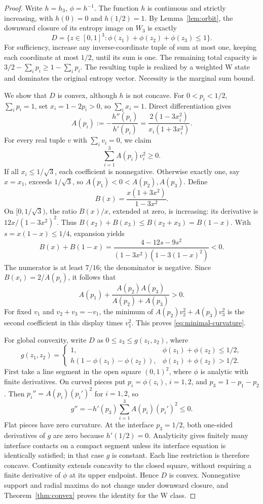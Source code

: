 \documentclass[11pt,a4paper]{article}
\begin{document}
\begin{proof}
Write \(h=h_3\), \(\phi=h^{-1}\). The function \(h\) is continuous
and strictly increasing, with \(h(0)=0\) and \(h(1/2)=1\).
By Lemma~\ref{lem:orbit}, the downward closure of its entropy image
on \(W_3\) is exactly
\[
 D=\{z\in[0,1]^3:\phi(z_1)+\phi(z_2)+\phi(z_3)\le1\}.
\]
For sufficiency, increase any inverse-coordinate tuple of sum at most
one, keeping each coordinate at most \(1/2\), until its sum is one.
The remaining total capacity is \(3/2-\sum_i p_i\ge1-\sum_i p_i\).
The resulting tuple is realized by a weighted W state and dominates
the original entropy vector. Necessity is the marginal sum bound.

We show that \(D\) is convex, although \(h\) is not concave. For
\(0<p_i<1/2\), \(\sum_i p_i=1\), set \(x_i=1-2p_i>0\), so
\(\sum_i x_i=1\). Direct differentiation gives
\[
 A(p_i):=-\frac{h''(p_i)}{h'(p_i)}
 =\frac{2(1-3x_i^2)}{x_i(1+3x_i^2)}.
\]
For every real tuple \(v\) with \(\sum_i v_i=0\), we claim
\begin{equation}
 \sum_{i=1}^3 A(p_i)v_i^2\ge0.\label{eq:minimal-curvature}
\end{equation}
If all \(x_i\le1/\sqrt3\), each coefficient is nonnegative.
Otherwise exactly one, say \(x=x_1\), exceeds \(1/\sqrt3\), so
\(A(p_1)<0<A(p_2),A(p_3)\). Define
\[
 B(x)=\frac{x(1+3x^2)}{1-3x^2}.
\]
On \([0,1/\sqrt3)\), the ratio \(B(x)/x\), extended at zero,
is increasing: its derivative is \(12x/(1-3x^2)^2\).
Thus \(B(x_2)+B(x_3)\le B(x_2+x_3)=B(1-x)\).
With \(s=x(1-x)\le1/4\), expansion yields
\[
 B(x)+B(1-x)
 =\frac{4-12s-9s^2}{(1-3x^2)(1-3(1-x)^2)}<0.
\]
The numerator is at least \(7/16\); the denominator is negative.
Since \(B(x_i)=2/A(p_i)\), it follows that
\[
 A(p_1)+\frac{A(p_2)A(p_3)}{A(p_2)+A(p_3)}>0.
\]
For fixed \(v_1\) and \(v_2+v_3=-v_1\), the minimum of
\(A(p_2)v_2^2+A(p_3)v_3^2\) is the second coefficient in this
display times \(v_1^2\). This proves \eqref{eq:minimal-curvature}.

For global convexity, write \(D\) as \(0\le z_3\le g(z_1,z_2)\), where
\[
 g(z_1,z_2)=
 \begin{cases}
 1,&\phi(z_1)+\phi(z_2)\le1/2,\\
 h(1-\phi(z_1)-\phi(z_2)),&\phi(z_1)+\phi(z_2)>1/2.
 \end{cases}
\]
First take a line segment in the open square \((0,1)^2\), where
\(\phi\) is analytic with finite derivatives. On curved pieces put
\(p_i=\phi(z_i)\), \(i=1,2\), and \(p_3=1-p_1-p_2\).
Then \(p_i''=A(p_i)(p_i')^2\) for \(i=1,2\), so
\[
 g''=-h'(p_3)\sum_{i=1}^3 A(p_i)(p_i')^2\le0.
\]
Flat pieces have zero curvature. At the interface \(p_3=1/2\),
both one-sided derivatives of \(g\) are zero because \(h'(1/2)=0\).
Analyticity gives finitely many interface contacts on a compact
segment unless its interface equation is identically satisfied;
in that case \(g\) is constant. Each line restriction is therefore
concave. Continuity extends concavity to the closed square, without
requiring a finite derivative of \(\phi\) at its upper endpoint.
Hence \(D\) is convex. Nonnegative support and radial maxima do not
change under downward closure, and Theorem~\ref{thm:convex} proves
the identity for the W class.


\end{proof}
\end{document}
